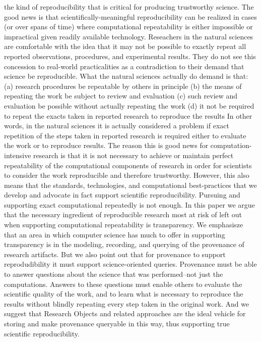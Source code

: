 		the kind of reproducibility that is critical for producing trustworthy science.
	The good news is that scientifically-meaningful reproducibility can be realized in cases (or over spans of time)
		where computational repeatability is either impossible or impractical given readily available technology.
	Reseachers in the natural sciences are comfortable with the idea that it may not be possible to exactly
		repeat all reported observations, procedures, and experimental results.
	They do not see this concession to real-world practicalities as a contradiction to their demand that science be reproducible.
	What the natural sciences actually do demand is that:
		(a) research procedures be repeatable by others in principle
		(b) the means of repeating the work be subject to review and evaluation
		(c) such review and evaluation be possible without actually repeating the work
		(d) it not be required to repeat the exacts taken in reported research to reproduce the results
	In other words, in the natural sciences it is actually considered a problem if exact repetition of the steps taken in reported research
		is required either to evaluate the work or to reproduce results.
	The reason this is good news for computation-intensive research is that it is not necessary to achieve or maintain perfect repeatability
		of the computational components of research in order for scientists to consider the work reproducible and therefore trustworthy.
	However, this also means that the standards, technologies, and computational best-practices that we develop and advocate
		in fact support scientific reproducibility. Pursuing and supporting exact computational repeatedly is not enough.
	In this paper we argue that the necessary ingredient of reproducible research most at risk of left out when supporting computational
		repeatability is transparency.
	We emphasisze that an area in which computer science has much to offer in supporting transparency is in the modeling, recording, 
		and querying of the provenance of research artifacts.
	But we also point out that for provenance to support reprodudibility it must support science-oriented queries.
	Provenance must be able to answer questions about the science that was performed--not just the computations.
	Answers to these questions must enable others to evaluate the scientific quality of the work, and to learn what is necessary to 
		reproduce the results without blindly repeating every step taken in the original work.
	And we suggest that Research Objects and related approaches are the ideal vehicle for storing and make provenance queryable
		in this way, thus supporting true scientific reproducibility.